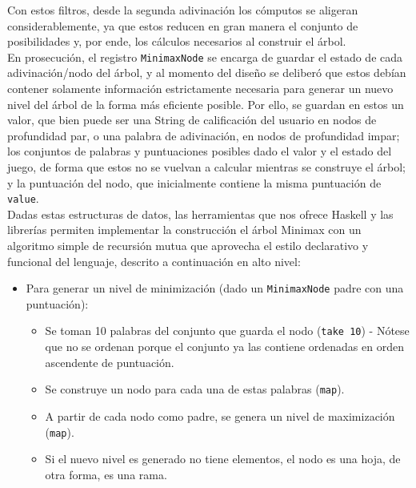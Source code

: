\documentclass[11pt]{article}
\begin{document}
Con estos filtros, desde la segunda adivinación los cómputos se aligeran
considerablemente, ya que estos reducen en gran manera el conjunto de posibilidades
y, por ende, los cálculos necesarios al construir el árbol. \\

En prosecución, el registro \texttt{MinimaxNode} se encarga de guardar el estado de
cada adivinación/nodo del árbol, y al momento del diseño se deliberó que estos
debían contener solamente información estrictamente necesaria para generar
un nuevo nivel del árbol de la forma más eficiente posible. Por ello, se guardan
en estos un valor, que bien puede ser una String de calificación del usuario en
nodos de profundidad par, o una palabra de adivinación, en nodos de profundidad
impar; los conjuntos de palabras y puntuaciones posibles dado el valor y el estado
del juego, de forma que estos no se vuelvan a calcular mientras se construye el
árbol; y la puntuación del nodo, que inicialmente contiene la misma puntuación de
\texttt{value}. \\

Dadas estas estructuras de datos, las herramientas que nos ofrece Haskell y las
librerías permiten implementar la construcción el árbol Minimax con un algoritmo 
simple de recursión mutua que aprovecha el estilo declarativo y funcional del
lenguaje, descrito a continuación en alto nivel:

\begin{itemize}
   \item Para generar un nivel de minimización (dado un \texttt{MinimaxNode} padre con una puntuación):
   \begin{itemize}
      \item Se toman 10 palabras del conjunto que guarda el nodo (\texttt{take 10}) - Nótese que no se ordenan porque el conjunto ya las contiene ordenadas en orden ascendente de puntuación.
      \item Se construye un nodo para cada una de estas palabras (\texttt{map}).
      \item A partir de cada nodo como padre, se genera un nivel de maximización (\texttt{map}).
      \item Si el nuevo nivel es generado no tiene elementos, el nodo es una hoja, de otra forma, es una rama.
   \end{itemize}
\end{itemize}

\pagebreak
\end{document}
